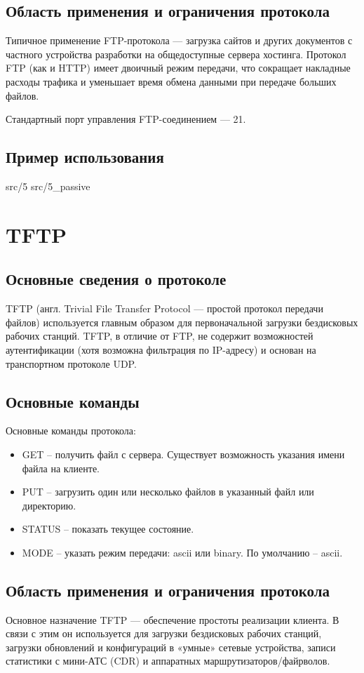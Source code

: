 \subsection{Область применения и ограничения протокола}
Типичное применение FTP-протокола — загрузка сайтов и других документов с частного устройства разработки на общедоступные сервера хостинга. Протокол FTP (как и HTTP) имеет двоичный режим передачи, что сокращает накладные расходы трафика и уменьшает время обмена данными при передаче больших файлов. 

Стандартный порт управления FTP-соединением — 21.

\subsection{Пример использования}
 {src/5}
 {src/5_passive}

\section{TFTP}

\subsection{Основные сведения о протоколе}
TFTP (англ. Trivial File Transfer Protocol — простой протокол передачи файлов) используется главным образом для первоначальной загрузки бездисковых рабочих станций. TFTP, в отличие от FTP, не содержит возможностей аутентификации (хотя возможна фильтрация по IP-адресу) и основан на транспортном протоколе UDP. 

\subsection{Основные команды}
Основные команды протокола:
\begin{itemize}
\item GET – получить файл с сервера. Существует возможность указания имени файла на клиенте.
\item PUT – загрузить один или несколько файлов в указанный файл или директорию.
\item STATUS – показать текущее состояние.
\item MODE – указать режим передачи: ascii или binary. По умолчанию – ascii.
\end{itemize}
    
\subsection{Область применения и ограничения протокола}
Основное назначение TFTP — обеспечение простоты реализации клиента. В связи с этим он используется для загрузки бездисковых рабочих станций, загрузки обновлений и конфигураций в «умные» сетевые устройства, записи статистики с мини-АТС (CDR) и аппаратных маршрутизаторов/файрволов.

